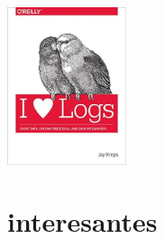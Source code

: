 \documentclass[spanish,12pt,a4paper,final,oneside]{book}
\begin{document}
\begin{itemize}
\includegraphics[width=3.5cm]{portada-IloveLogs-JayKreps.jpg} 

\end{itemize}

\section{interesantes}
\end{document}

